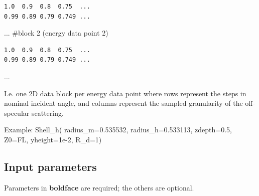 \begin{verbatim}
1.0  0.9  0.8  0.75  ...
0.99 0.89 0.79 0.749 ...
\end{verbatim}

... \#block 2 (energy data point 2)

\begin{verbatim}
1.0  0.9  0.8  0.75  ...
0.99 0.89 0.79 0.749 ...
\end{verbatim}

...

I.e. one 2D data block per energy data point where rows represent the steps in nominal incident angle, and columns represent the sampled granularity of the off-specular scattering.

Example: Shell\_h( radius\_m=0.535532, radius\_h=0.533113, zdepth=0.5, Z0=FL, yheight=1e-2, R\_d=1)

\subsection*{Input parameters}
Parameters in \textbf{boldface} are required; the others are optional.

